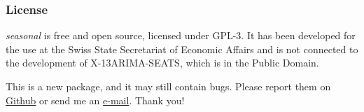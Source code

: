 \subsubsection{License}\label{license}

\emph{seasonal} is free and open source, licensed under GPL-3. It has
been developed for the use at the Swiss State Secretariat of Economic
Affairs and is not connected to the development of X-13ARIMA-SEATS,
which is in the Public Domain.

This is a new package, and it may still contain bugs. Please report them
on \href{https://github.com/christophsax/seasonal}{Github} or send me an
\href{mailto:christoph.sax@gmail.com}{e-mail}. Thank you!

